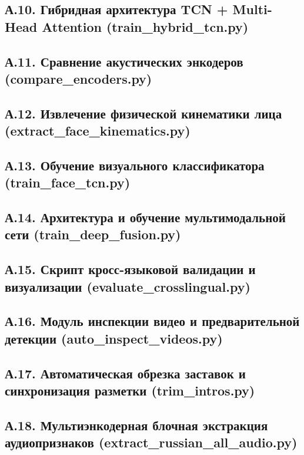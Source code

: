 \documentclass[a4paper,14pt]{extarticle}
\begin{document}
	\subsection*{А.10. Гибридная архитектура TCN + Multi-Head Attention (train\_hybrid\_tcn.py)}
	
	
	\subsection*{А.11. Сравнение акустических энкодеров (compare\_encoders.py)}
	
	
	\subsection*{А.12. Извлечение физической кинематики лица (extract\_face\_kinematics.py)}
	
	
	\subsection*{А.13. Обучение визуального классификатора (train\_face\_tcn.py)}
	
	
	\subsection*{А.14. Архитектура и обучение мультимодальной сети (train\_deep\_fusion.py)}
	
	
	\subsection*{А.15. Скрипт кросс-языковой валидации и визуализации (evaluate\_crosslingual.py)}
	
	
	\subsection*{А.16. Модуль инспекции видео и предварительной детекции (auto\_inspect\_videos.py)}
	
	
	\subsection*{А.17. Автоматическая обрезка заставок и синхронизация разметки (trim\_intros.py)}
	
	
	\subsection*{А.18. Мультиэнкодерная блочная экстракция аудиопризнаков (extract\_russian\_all\_audio.py)}
	
\end{document}
